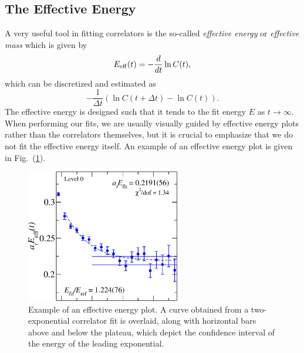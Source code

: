 \subsection{The Effective Energy}\label{sec:eff_mass}
A very useful tool in fitting correlators is the so-called \emph{effective energy} or \emph{effective mass} which is given by
\begin{equation}
    E_{\rm{eff}}(t) = -\frac{d}{dt}\ln C(t),
\end{equation}
which can be discretized and estimated as
\begin{equation}
    -\frac{1}{\Delta t}\left(\ln C(t+\Delta t)-\ln C(t)\right).
\end{equation}
The effective energy is designed such that it tends to the fit energy $E$ as $t\rightarrow \infty$. When performing our fits, we are usually visually guided by effective energy plots rather than the correlators themselves, but it is crucial to emphasize that we do not fit the effective energy itself. An example of an effective energy plot is given in Fig.~(\ref{fig:eff_en_ex}).

\begin{figure}
    \centering
    \hspace*{-0.75in}\includegraphics[width=0.6\textwidth]{figures/effmass.pdf}
    \caption[Example of an effective energy plot.]{Example of an effective energy plot. A curve obtained from a two-exponential correlator fit is overlaid, along with horizontal bars above and below the plateau, which depict the confidence interval of the energy of the leading exponential.}\label{fig:eff_en_ex}
\end{figure}

